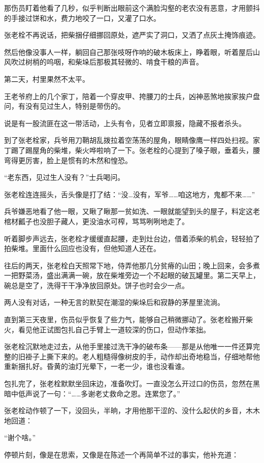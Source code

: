 那伤员盯着他看了几秒，似乎判断出眼前这个满脸沟壑的老农没有恶意，才用颤抖的手接过饼和水，费力地咬了一口，又灌了口水。

张老栓不再说话，把柴捆仔细挪回原处，遮严实了洞口，又洒了点灰土掩饰痕迹。

然后他像没事人一样，躺回自己那张吱呀作响的破木板床上，睁着眼，听着屋后山风吹过树梢的呜咽，和柴垛后那极其轻微的、啃食干粮的声音。

第二天，村里果然不太平。

王老爷府上的几个家丁，陪着一个穿皮甲、挎腰刀的士兵，凶神恶煞地挨家挨户盘问，有没有见过生人，特别是带伤的。

说是有一股流匪在这一带活动，上头有令，见者立即禀报，隐藏不报者杀头。

到了张老栓家，兵爷用刀鞘胡乱拨拉着空荡荡的屋角，眼睛像鹰一样四处扫视。家丁踢了踢屋角的柴堆，柴火哗啦响了一下。张老栓的心提到了嗓子眼，垂着头，腰弯得更厉害，脸上是惯有的木然和惶恐。

“老东西，见过生人没有？”士兵喝问。

张老栓连连摇头，舌头像是打了结：“没…没有，军爷……咱这地方，鬼都不来……”

兵爷嫌恶地看了他一眼，又瞅了瞅那一贫如洗、一眼就能望到头的屋子，料定这老棺材瓤子也没胆子藏人，更没油水可榨，骂骂咧咧地走了。

听着脚步声远去，张老栓才缓缓直起腰，走到灶台边，借着添柴的机会，轻轻拍了拍柴堆。里面什么回应也没有，但他知道人还在。

往后的两天，张老栓白天照常下地，侍弄他那几分贫瘠的山田；晚上回来，会多煮一把野菜汤，盛出满满一碗，放在柴堆旁边一个不起眼的破瓦罐里。第二天早上，碗总是空了，洗得干干净净放回原处。饼子也时会少一点。

两人没有对话，一种无言的默契在潮湿的柴垛后和寂静的茅屋里流淌。

直到第三天夜里，伤员似乎恢复了些力气，能够自己稍微挪动了。张老栓搬开柴火，看见他正试图包扎自己手臂上一道较深的伤口，但动作笨拙。

张老栓沉默地走过去，从他手里接过洗干净的破布条——那是从他唯一一件还算完整的旧褂子上撕下来的。老人粗糙得像树皮的手，动作却出奇地稳当，仔细地帮他重新捆扎好。昏黄的油灯光晕下，一老一少，谁也没看谁。

包扎完了，张老栓默默坐回床边，准备吹灯。一直没怎么开过口的伤员，忽然在黑暗中低声说了一句：“……多谢老丈救命之恩。连累您了。”

张老栓动作顿了一下，没回头，半晌，才用他那干涩的、没什么起伏的乡音，木木地回道：

“谢个啥。”

停顿片刻，像是在思索，又像是在陈述一个再简单不过的事实，他补充道：

